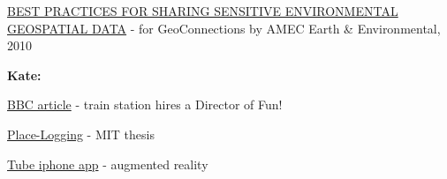 \documentclass[11pt]{report}
\begin{document}
\href{http://www.geoconnections.org/publications/Key_documents/Sensitive_Env_Geo_Data_Guide_EN_v1.pdf}{BEST PRACTICES FOR SHARING SENSITIVE ENVIRONMENTAL GEOSPATIAL DATA} - for GeoConnections by AMEC Earth \& Environmental, 2010

\textbf{Kate:}

\href{http://news.bbc.co.uk/2/hi/uk_news/8216071.stm}{BBC article} - train station hires a Director of Fun!

\href{http://www.rajworks.com/index1.htm}{Place-Logging} - MIT thesis

\href{http://www.youtube.com/watch?v=U2uH-jrsSxs&feature=rec-LGOUT-exp_fresh+div-1r-3-HM}{Tube iphone app} - augmented reality


{\small


}
\end{document}
